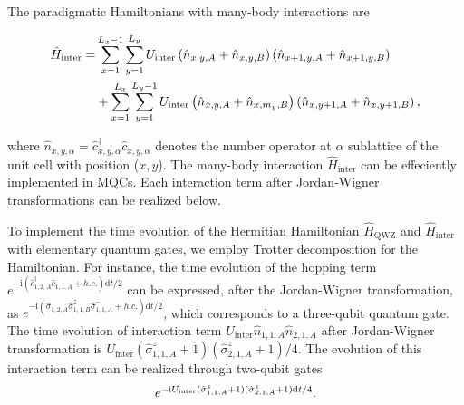 \documentclass[longbibliography, aps, prx, amsmath, amssymb, amsfonts, twocolumn,superscriptaddress, footinbib]{revtex4-1}
\begin{document}
	The paradigmatic Hamiltonians with many-body interactions are
	\begin{widetext}
		\begin{align}
			\hat{H}_{\text{inter}} = &\sum_{{x}=1}^{L_{x}-1} \sum_{{y}=1}^{L_{y}}  U_{\text{inter}} \left(\hat{n}_{{x}, {y}, A}+\hat{n}_{{x}, {y}, B}\right) \left(\hat{n}_{{x}+1, {y}, A}+\hat{n}_{{x}+1, {y}, B}\right)\notag\\
			& + 
			\sum_{{x}=1}^{L_{x}} \sum_{{y}=1}^{L_{y}-1}  U_{\text{inter}} \left(\hat{n}_{{x}, {y}, A}+\hat{n}_{{x}, m_y, B}\right) \left(\hat{n}_{{x}, {y}+1, A}+\hat{n}_{{x}, {y}+1, B}\right),\\
		\end{align}
	\end{widetext}
	where $\hat{n}_{{x},{y},\alpha}=\hat{c}_{x,y,\alpha}^{\dagger}\hat{c}_{x,y,\alpha}$ denotes the number operator at $\alpha$ sublattice of the unit cell with position (${x},{y}$).
	The many-body interaction $\hat{H}_{\text{inter}}$ can be effeciently implemented in MQCs. Each interaction term after Jordan-Wigner transformations can be realized below.

	To implement the time evolution of the Hermitian Hamiltonian $\hat{H}_{\text{QWZ}}$ and $\hat{H}_{\text{inter}}$ with elementary quantum gates, we employ Trotter decomposition for the Hamiltonian. For instance, the time evolution of the hopping term $e^{-\mathrm{i}  (\hat{c}_{1,2,A}^{\dagger} \hat{c}_{1,1,A} +h.c.)\mathrm{d} t/2}$ can be expressed, after the Jordan-Wigner transformation, as $e^{-\mathrm{i} (\hat{\sigma}_{1,2,A} \hat{\sigma}^z_{1,1,B}\hat{\sigma}_{1,1,A}^{-} +h.c.)\mathrm{d} t /2}$, which corresponds to a three-qubit quantum gate.
	The time evolution of interaction term $ U_{\text{inter}} \hat{n}_{1, 1, A} \hat{n}_{2,1,A}$ after Jordan-Wigner transformation is $U_{\text{inter}} (\hat{\sigma}^z_{1,1,A}+1)(\hat{\sigma}^z_{2,1,A}+1)/4$. The evolution of this interaction term can be realized through two-qubit gates 
	\begin{equation}
		e^{-\mathrm{i} U_{\text{inter}} (\hat{\sigma}^z_{1,1,A}+1) (\hat{\sigma}^z_{2,1,A}+1) \mathrm{d}t/4 }. \notag
	\end{equation}
\end{document}
